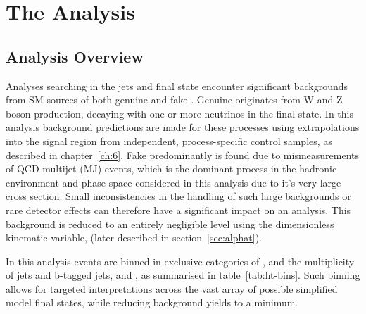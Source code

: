 \chapter{The \alphat Analysis}
\label{ch:5}

\ifpdf
    \graphicspath{{Chapter5/Figs/Raster/}{Chapter5/Figs/PDF/}{Chapter5/Figs/}}
\else
    \graphicspath{{Chapter5/Figs/Vector/}{Chapter5/Figs/}}
\fi


\section{Analysis Overview}  %
\label{sec:selection_analysis_overview}

Analyses searching in the jets and \met final state encounter significant 
backgrounds from SM sources of both genuine and fake \met. Genuine \met 
originates from W and Z boson production, decaying with one or more neutrinos in
the final state. In this analysis background predictions are made for these
processes using 
extrapolations into the signal region from independent, process-specific control
samples, as described in chapter~\ref{ch:6}.
Fake \met predominantly is found due to mismeasurements of QCD 
multijet (MJ) events, which is the dominant process in the hadronic environment
and 
phase space considered in this analysis due to it's very large cross section. 
Small inconsistencies in the handling of such large backgrounds or rare detector
effects can therefore 
have a significant impact on an analysis. This background is reduced to an 
entirely negligible level using the dimensionless kinematic variable, \alphat
(later described in section~\ref{sec:alphat}).


In this analysis events are binned in exclusive categories of \HT, 
and the multiplicity of jets and b-tagged jets,  
\nj and \nb, as summarised in table~\ref{tab:ht-bins}. Such binning allows for
targeted interpretations across the vast array of
possible simplified model final states, while reducing background yields to a 
minimum.

